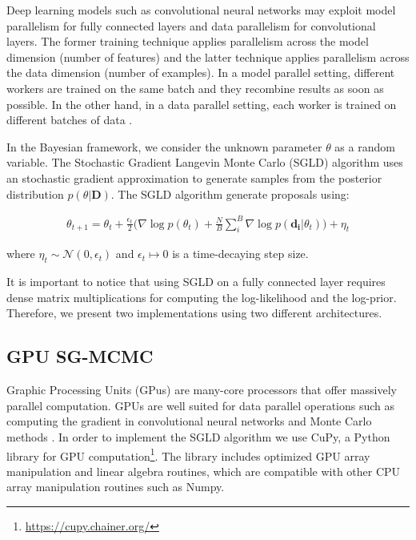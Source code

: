 \documentclass[conference]{IEEEtran}
\begin{document}
Deep learning models such as convolutional neural networks may exploit model parallelism for fully connected layers and data parallelism for convolutional layers. The former training technique applies parallelism across the model dimension (number of features) and the latter technique applies parallelism across the data dimension (number of examples). In a model parallel setting, different workers are trained on the same batch and they recombine results as soon as possible. In the other hand, in a data parallel setting, each worker is trained on different batches of data \cite{LI201695}. 

In the Bayesian framework, we consider the unknown parameter $\theta$ as a random variable. The Stochastic Gradient Langevin Monte Carlo (SGLD) algorithm uses an stochastic gradient approximation to generate samples from the posterior distribution $p(\theta \vert \mathbf{D})$. The SGLD algorithm generate proposals using:

\begin{align}
\theta_{t+1}=\theta_{t}+\frac{\epsilon_t}{2}\Big(\nabla\operatorname{log}p(\theta_{t})+\frac{N}{B} \sum_i^B \nabla \operatorname{log} p(\mathbf{d_i} \vert \theta_{t})\Big) + \eta_t
\label{eq:sgld}
\end{align}

where $\eta_t \sim \mathcal N(0,\epsilon_t)$ and $\epsilon_t \mapsto 0$ is a time-decaying step size.

It is important to notice that using SGLD on a fully connected layer requires dense matrix multiplications for computing the log-likelihood and the log-prior. Therefore, we present two implementations using two different architectures.  
    
\subsection{GPU SG-MCMC}
Graphic Processing Units (GPus) are many-core processors that offer massively parallel computation. GPUs are well suited for data parallel operations such as computing the gradient in convolutional neural networks and Monte Carlo methods \cite{lee2010utility}. In order to implement the SGLD algorithm we use CuPy, a Python library for GPU computation\footnote{\url{https://cupy.chainer.org/}}. The library includes optimized GPU array manipulation and linear algebra routines, which are compatible with other CPU array manipulation routines such as Numpy. 
 
\end{document}
